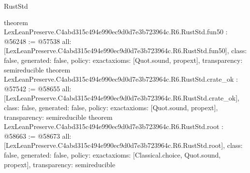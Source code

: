 \begin{lexlean}{RustStd}
\begin{coremodule}
{}
theorem LexLeanPreserve.C4abd315c494e990ec9d0d7e3b723964c.R6.RustStd.fun50 : @56248 := @57538 {
  all: [LexLeanPreserve.C4abd315c494e990ec9d0d7e3b723964c.R6.RustStd.fun50],
  class: false,
  generated: false,
  policy: exact{axioms: [Quot.sound, propext]},
  transparency: semireducible
}
theorem LexLeanPreserve.C4abd315c494e990ec9d0d7e3b723964c.R6.RustStd.crate_ok : @57542 := @58655 {
  all: [LexLeanPreserve.C4abd315c494e990ec9d0d7e3b723964c.R6.RustStd.crate_ok],
  class: false,
  generated: false,
  policy: exact{axioms: [Quot.sound, propext]},
  transparency: semireducible
}
theorem LexLeanPreserve.C4abd315c494e990ec9d0d7e3b723964c.R6.RustStd.root : @58663 := @58673 {
  all: [LexLeanPreserve.C4abd315c494e990ec9d0d7e3b723964c.R6.RustStd.root],
  class: false,
  generated: false,
  policy: exact{axioms: [Classical.choice, Quot.sound, propext]},
  transparency: semireducible
}


\end{coremodule}
\end{lexlean}
